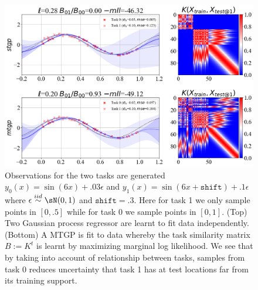 \documentclass[11pt]{article}
\begin{document}
\begin{center} 
\begin{figure}[h!]
    \includegraphics[width=\textwidth]{assets/plt_mtgp_coorperative.png}
    \caption{Observations for the two tasks are generated $y_0(x)=\sin(6x) + .03 \epsilon$ and $y_1(x)=\sin(6x + \texttt{shift}) + .1 \epsilon$ where $\epsilon\overset{iid}{\sim} \sN(0,1)$ and $\texttt{shift}=.3$. Here for task 1 we only sample points in $[0,.5]$ while for task 0 we sample points in $[0,1]$. (Top) Two Gaussian process regressor are learnt to fit data independently. (Bottom) A MTGP is fit to data whereby the task similarity matrix $B:=K^t$ is learnt by maximizing marginal log likelihood. We see that by taking into account of relationship between tasks, samples from task 0 reduces uncertainty that task 1 has at test locations far from its training support.}
    \label{fig:plt_mtgp_coorperative}
\end{figure}
\end{center} 
\end{document}
